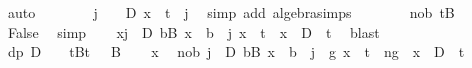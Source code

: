 \begin{isabellebody}
\ auto\isanewline
\ \ \ \ \ \ \isamarkupfalse%
\ {\isachardoublequoteopen}{\isasymexists}j\ {\isasymin}\ {\isacharbraceleft}{\kern0pt}{}\ {\isachardot}{\kern0pt}{\isachardot}{\kern0pt}\ D{\isacharbraceright}{\kern0pt}{\isachardot}{\kern0pt}\ x\ {\isacharequal}{\kern0pt}\ t\ {\isacharplus}{\kern0pt}\ j{\isachardoublequoteclose}\ \isamarkupfalse%
\ {\isacharparenleft}{\kern0pt}simp\ add{\isacharcolon}{\kern0pt}\ algebra{\isacharunderscore}{\kern0pt}simps{\isacharparenright}{\kern0pt}\isanewline
\ \ \ \ \ \ \isamarkupfalse%
\ nob\ tB\ \isamarkupfalse%
\ {\isachardoublequoteopen}False{\isachardoublequoteclose}\ \isamarkupfalse%
\ simp\isacommand{{\isacharbraceright}{\kern0pt}}\isamarkupfalse%
\isanewline
\ \ \isamarkupfalse%
\ {\isachardoublequoteopen}{\isasymforall}x{\isachardot}{\kern0pt}{\isacharparenleft}{\kern0pt}{\isasymforall}j{\isasymin}{\isacharbraceleft}{\kern0pt}{}\ {\isachardot}{\kern0pt}{\isachardot}{\kern0pt}\ D{\isacharbraceright}{\kern0pt}{\isachardot}{\kern0pt}\ {\isasymforall}b{\isasymin}B{\isachardot}{\kern0pt}\ x\ {\isasymnoteq}\ b\ {\isacharplus}{\kern0pt}\ j{\isacharparenright}{\kern0pt}{\isasymlongrightarrow}\ {\isacharparenleft}{\kern0pt}x\ {\isachargreater}{\kern0pt}\ t{\isacharparenright}{\kern0pt}\ {\isasymlongrightarrow}\ {\isacharparenleft}{\kern0pt}x\ {\isacharminus}{\kern0pt}\ D\ {\isachargreater}{\kern0pt}\ t{\isacharparenright}{\kern0pt}{\isachardoublequoteclose}\ \isamarkupfalse%
\ blast\isanewline
{}\isamarkupfalse%
\isanewline
\ \ \isamarkupfalse%
\ dp{\isacharcolon}{\kern0pt}\ {\isachardoublequoteopen}D\ {\isachargreater}{\kern0pt}\ {}{\isachardoublequoteclose}\ \ tB{\isacharcolon}{\kern0pt}{\isachardoublequoteopen}t\ {\isacharminus}{\kern0pt}\ {}{\isasymin}\ B{\isachardoublequoteclose}\isanewline
\ \ \isacommand{{\isacharbraceleft}{\kern0pt}}\isamarkupfalse%
\isamarkupfalse%
\ x\ \isamarkupfalse%
\ nob{\isacharcolon}{\kern0pt}\ {\isachardoublequoteopen}{\isasymforall}j{\isasymin}{\isacharbraceleft}{\kern0pt}{}\ {\isachardot}{\kern0pt}{\isachardot}{\kern0pt}\ D{\isacharbraceright}{\kern0pt}{\isachardot}{\kern0pt}\ {\isasymforall}b{\isasymin}B{\isachardot}{\kern0pt}\ x\ {\isasymnoteq}\ b\ {\isacharplus}{\kern0pt}\ j{\isachardoublequoteclose}\ \ g{\isacharcolon}{\kern0pt}\ {\isachardoublequoteopen}x\ {\isasymge}\ t{\isachardoublequoteclose}\ \ ng{\isacharcolon}{\kern0pt}\ {\isachardoublequoteopen}{\isasymnot}\ {\isacharparenleft}{\kern0pt}x\ {\isacharminus}{\kern0pt}\ D{\isacharparenright}{\kern0pt}\ {\isasymge}\ t{\isachardoublequoteclose}\isanewline

\end{isabellebody}
